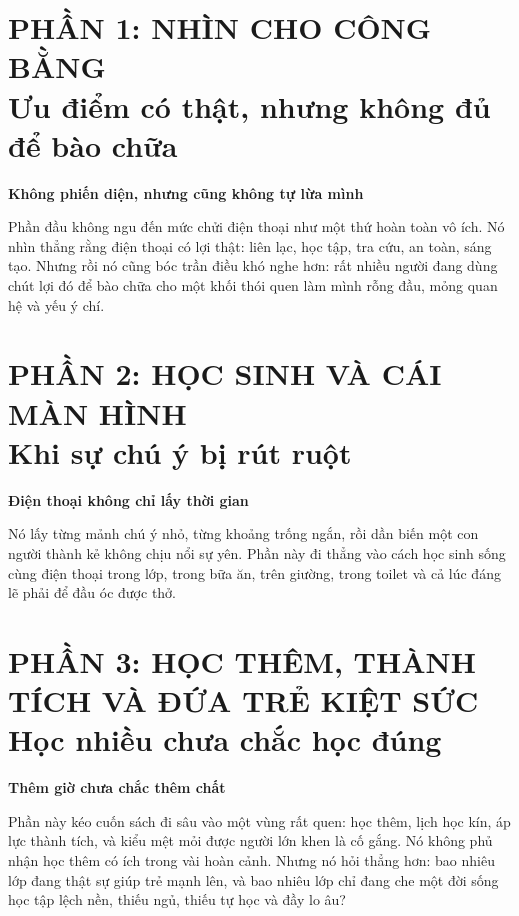 \documentclass[14pt,a4paper,twoside]{extbook}
\newcommand{\partintro}[2]{%
  \begin{center}
    \begin{minipage}{0.86\textwidth}
    \begin{tcolorbox}[
      colback=bookbg,
      colframe=booksecondary,
      boxrule=0.8pt,
      arc=4pt,
      enhanced,
      left=8pt,right=8pt,top=8pt,bottom=8pt
    ]
    {\centering\bfseries\color{bookprimary}#1\par}
    \vspace{5pt}
    {\small #2}
    \end{tcolorbox}
    \end{minipage}
  \end{center}
  \vspace{8pt}
}
\begin{document}





\frontmatter
\tableofcontents
\clearpage


\mainmatter

\part*{PHẦN 1: NHÌN CHO CÔNG BẰNG\\\large Ưu điểm có thật, nhưng không đủ để bào chữa}
\partintro{Không phiến diện, nhưng cũng không tự lừa mình}{Phần đầu không ngu đến mức chửi điện thoại như một thứ hoàn toàn vô ích. Nó nhìn thẳng rằng điện thoại có lợi thật: liên lạc, học tập, tra cứu, an toàn, sáng tạo. Nhưng rồi nó cũng bóc trần điều khó nghe hơn: rất nhiều người đang dùng chút lợi đó để bào chữa cho một khối thói quen làm mình rỗng đầu, mỏng quan hệ và yếu ý chí.}






\part*{PHẦN 2: HỌC SINH VÀ CÁI MÀN HÌNH\\\large Khi sự chú ý bị rút ruột}
\partintro{Điện thoại không chỉ lấy thời gian}{Nó lấy từng mảnh chú ý nhỏ, từng khoảng trống ngắn, rồi dần biến một con người thành kẻ không chịu nổi sự yên. Phần này đi thẳng vào cách học sinh sống cùng điện thoại trong lớp, trong bữa ăn, trên giường, trong toilet và cả lúc đáng lẽ phải để đầu óc được thở.}






\part*{PHẦN 3: HỌC THÊM, THÀNH TÍCH VÀ ĐỨA TRẺ KIỆT SỨC\\\large Học nhiều chưa chắc học đúng}
\partintro{Thêm giờ chưa chắc thêm chất}{Phần này kéo cuốn sách đi sâu vào một vùng rất quen: học thêm, lịch học kín, áp lực thành tích, và kiểu mệt mỏi được người lớn khen là cố gắng. Nó không phủ nhận học thêm có ích trong vài hoàn cảnh. Nhưng nó hỏi thẳng hơn: bao nhiêu lớp đang thật sự giúp trẻ mạnh lên, và bao nhiêu lớp chỉ đang che một đời sống học tập lệch nền, thiếu ngủ, thiếu tự học và đầy lo âu?}



\end{document}
